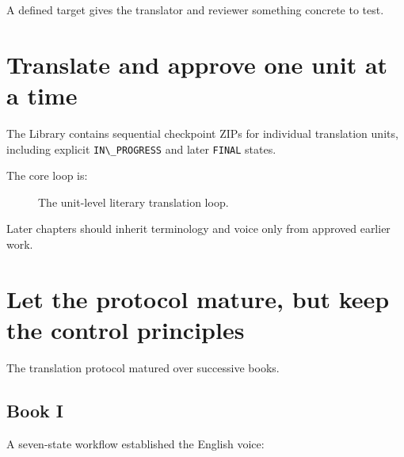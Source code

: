 \documentclass[11pt,oneside,openany]{book}
\newcommand{\passthrough}[1]{#1}
\begin{document}
A defined target gives the translator and reviewer something concrete to test.

\chapter{Translate and approve one unit at a time}

The Library contains sequential checkpoint ZIPs for individual translation units, including explicit \passthrough{\lstinline!IN\_PROGRESS!} and later \passthrough{\lstinline!FINAL!} states.

The core loop is:

\begin{figure}[htbp]
\centering
{}
\caption{The unit-level literary translation loop.}
\end{figure}

Later chapters should inherit terminology and voice only from approved earlier work.

\chapter{Let the protocol mature, but keep the control principles}

The translation protocol matured over successive books.

\section{Book I}\label{book-i}

A seven-state workflow established the English voice:
\end{document}

